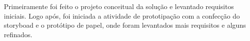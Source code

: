        Primeiramente foi feito o projeto conceitual da solução e levantado requisitos iniciais. Logo após, foi iniciada a atividade de prototipação com a 
       confecção do storyboad e o protótipo de papel, onde foram levantados mais requisitos e alguns refinados.
   

